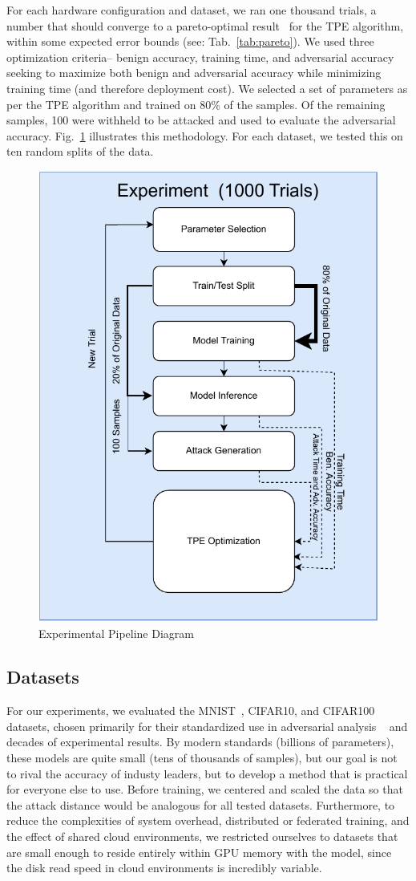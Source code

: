 \documentclass[conference]{IEEEtran}
\begin{document}
For each hardware configuration and dataset, we ran one thousand trials, a number that should converge to a pareto-optimal result~\cite{} for the TPE algorithm, within some expected error bounds (see: Tab.~\ref{tab:pareto}). We used three optimization criteria-- benign accuracy, training time, and adversarial accuracy seeking to maximize both benign and adversarial accuracy while minimizing training time (and therefore deployment cost). We selected a set of parameters as per the TPE algorithm and trained on 80\% of the samples. Of the remaining samples, 100 were withheld to be attacked and used to evaluate the adversarial accuracy. Fig.~\ref{fig:experiments} illustrates this methodology. For each dataset, we tested this on ten random splits of the data. 

\begin{figure}
    \centering
    \includegraphics[width=.45\textwidth]{plots/experiment.pdf}
    \caption{Experimental Pipeline Diagram}
    \label{fig:experiments}
\end{figure}


\subsection{Datasets}
For our experiments, we evaluated the MNIST~\cite{mnist}, CIFAR10\cite{cifar}, and CIFAR100\cite{cifar} datasets, chosen primarily for their standardized use in adversarial analysis ~\cite{madry2017towards,croce_reliable_2020,carlini_towards_2017,deepfool} and decades of experimental results. By modern standards (billions of parameters), these models are quite small (tens of thousands of samples), but our goal is not to rival the accuracy of industy leaders, but to develop a method that is practical for everyone else to use.
Before training, we centered and scaled the data so that the attack distance would be analogous for all tested datasets. Furthermore, to reduce the complexities of system overhead, distributed or federated training, and the effect of shared cloud environments, we restricted ourselves to datasets that are small enough to reside entirely within GPU memory with the model, since the disk read speed in cloud environments is incredibly variable.
\end{document}
